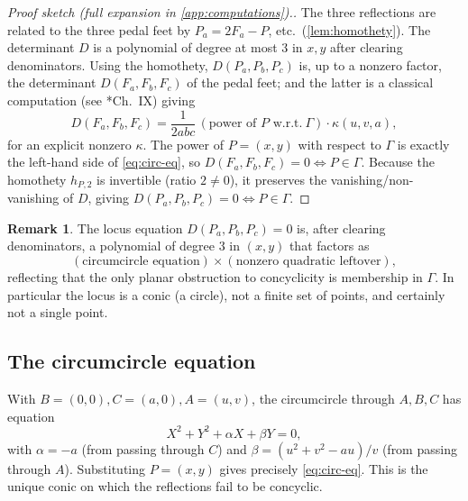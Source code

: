 \documentclass[11pt,a4paper]{article}
\theoremstyle{definition}
\newtheorem{remark}[theorem]{Remark}
\newcommand{\Pa}{P_{a}}
\newcommand{\Pb}{P_{b}}
\newcommand{\Pc}{P_{c}}
\newcommand{\Fa}{F_{a}}
\newcommand{\Fb}{F_{b}}
\newcommand{\Fc}{F_{c}}
\newcommand{\circc}{\Gamma}
\begin{document}
\begin{proof}[Proof sketch (full expansion in \cref{app:computations}).]
The three reflections are related to the three pedal feet by $\Pa=2\Fa-P$, etc.\ (\cref{lem:homothety}). The determinant $D$ is a polynomial of degree at most $3$ in $x,y$ after clearing denominators. Using the homothety, $D(\Pa,\Pb,\Pc)$ is, up to a nonzero factor, the determinant $D(\Fa,\Fb,\Fc)$ of the pedal feet; and the latter is a classical computation (see \cite{Johnson}*{Ch.~IX}) giving
\begin{equation}\label{eq:pedal-det}
D(\Fa,\Fb,\Fc)=\frac{1}{2abc}\,(\text{power of }P\text{ w.r.t.}\ \circc)\cdot\kappa(u,v,a),
\end{equation}
for an explicit nonzero $\kappa$. The power of $P=(x,y)$ with respect to $\circc$ is exactly the left-hand side of \cref{eq:circ-eq}, so $D(\Fa,\Fb,\Fc)=0\iff P\in\circc$. Because the homothety $h_{P,2}$ is invertible (ratio $2\neq0$), it preserves the vanishing/non-vanishing of $D$, giving $D(\Pa,\Pb,\Pc)=0\iff P\in\circc$.
\end{proof}

\begin{remark}\label{rem:degree}
The locus equation $D(\Pa,\Pb,\Pc)=0$ is, after clearing denominators, a polynomial of degree $3$ in $(x,y)$ that factors as
\begin{equation}\label{eq:factor}
(\text{circumcircle equation})\times(\text{nonzero quadratic leftover}),
\end{equation}
reflecting that the only planar obstruction to concyclicity is membership in $\circc$. In particular the locus is a conic (a circle), not a finite set of points, and certainly not a single point.
\end{remark}

\subsection{The circumcircle equation}

With $B=(0,0),C=(a,0),A=(u,v)$, the circumcircle through $A,B,C$ has equation
\begin{equation}\label{eq:circ-full}
X^{2}+Y^{2}+\alpha X+\beta Y=0,
\end{equation}
with $\alpha=-a$ (from passing through $C$) and $\beta=(u^{2}+v^{2}-au)/v$ (from passing through $A$). Substituting $P=(x,y)$ gives precisely \cref{eq:circ-eq}. This is the unique conic on which the reflections fail to be concyclic.
\end{document}
